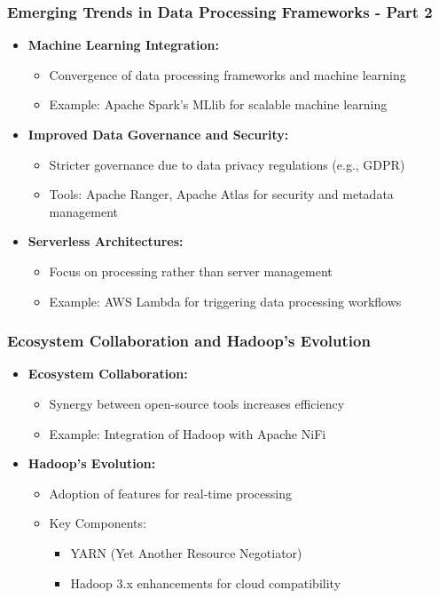 \documentclass[aspectratio=169]{beamer}
\begin{document}
\begin{frame}[fragile]
    \frametitle{Emerging Trends in Data Processing Frameworks - Part 2}
    \begin{itemize}
        \item \textbf{Machine Learning Integration:}
            \begin{itemize}
                \item Convergence of data processing frameworks and machine learning
                \item Example: Apache Spark's MLlib for scalable machine learning
            \end{itemize}
        \item \textbf{Improved Data Governance and Security:}
            \begin{itemize}
                \item Stricter governance due to data privacy regulations (e.g., GDPR)
                \item Tools: Apache Ranger, Apache Atlas for security and metadata management
            \end{itemize}
        \item \textbf{Serverless Architectures:}
            \begin{itemize}
                \item Focus on processing rather than server management
                \item Example: AWS Lambda for triggering data processing workflows
            \end{itemize}
    \end{itemize}
\end{frame}

\begin{frame}[fragile]
    \frametitle{Ecosystem Collaboration and Hadoop's Evolution}
    \begin{itemize}
        \item \textbf{Ecosystem Collaboration:}
            \begin{itemize}
                \item Synergy between open-source tools increases efficiency
                \item Example: Integration of Hadoop with Apache NiFi
            \end{itemize}
        \item \textbf{Hadoop's Evolution:}
            \begin{itemize}
                \item Adoption of features for real-time processing
                \item Key Components:
                    \begin{itemize}
                        \item YARN (Yet Another Resource Negotiator)
                        \item Hadoop 3.x enhancements for cloud compatibility
                    \end{itemize}
            \end{itemize}
    \end{itemize}
\end{frame}
\end{document}

